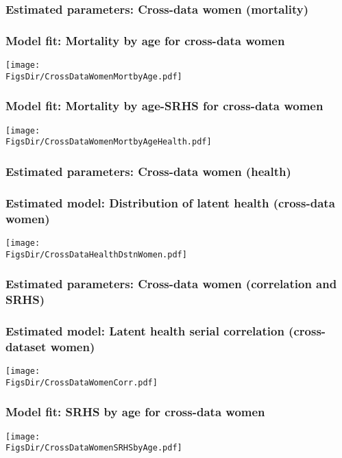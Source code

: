 \documentclass[aspectratio=169]{beamer}
\newcommand{\FigsDir}{../Figures}
\newcommand{\TabsDir}{../Tables}
\begin{document}
\begin{frame}\frametitle{Estimated parameters: Cross-data women (mortality)}

\end{frame}


\begin{frame}\frametitle{Model fit: Mortality by age for cross-data women}
\begin{center}
\texttt{[image: \\FigsDir/CrossDataWomenMortbyAge.pdf]}
\end{center}
\end{frame}


\begin{frame}\frametitle{Model fit: Mortality by age-SRHS for cross-data women}
\begin{center}
\texttt{[image: \\FigsDir/CrossDataWomenMortbyAgeHealth.pdf]}
\end{center}
\end{frame}


\begin{frame}\frametitle{Estimated parameters: Cross-data women (health)}

\end{frame}


\begin{frame}\frametitle{Estimated model: Distribution of latent health (cross-data women)}
\begin{center}
	\texttt{[image: \\FigsDir/CrossDataHealthDstnWomen.pdf]}
\end{center}
\end{frame}


\begin{frame}\frametitle{Estimated parameters: Cross-data women (correlation and SRHS)}
\vspace{-0.25cm}

\end{frame}


\begin{frame}\frametitle{Estimated model: Latent health serial correlation (cross-dataset women)}
\begin{center}
	\texttt{[image: \\FigsDir/CrossDataWomenCorr.pdf]}
\end{center}
\end{frame}


\begin{frame}\frametitle{Model fit: SRHS by age for cross-data women}
\begin{center}
	\texttt{[image: \\FigsDir/CrossDataWomenSRHSbyAge.pdf]}
\end{center}
\end{frame}
\end{document}

